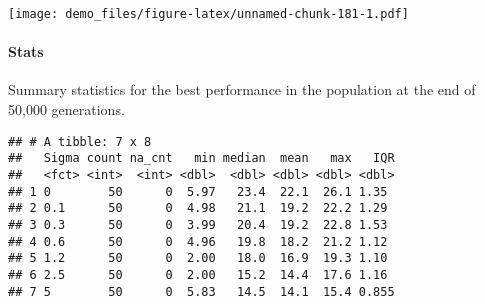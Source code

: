 \documentclass[]{book}
\newenvironment{Shaded}{\begin{snugshade}}{\end{snugshade}}
\newcommand{\DataTypeTok}[1]{\textcolor[rgb]{0.13,0.29,0.53}{#1}}
\newcommand{\KeywordTok}[1]{\textcolor[rgb]{0.13,0.29,0.53}{\textbf{#1}}}
\newcommand{\NormalTok}[1]{#1}
\newcommand{\OperatorTok}[1]{\textcolor[rgb]{0.81,0.36,0.00}{\textbf{#1}}}
\newcommand{\OtherTok}[1]{\textcolor[rgb]{0.56,0.35,0.01}{#1}}
\newcommand{\StringTok}[1]{\textcolor[rgb]{0.31,0.60,0.02}{#1}}
\let\oldparagraph\paragraph
\renewcommand{\paragraph}[1]{\oldparagraph{#1}\mbox{}}
\begin{document}
\texttt{[image: demo\_files/figure-latex/unnamed-chunk-181-1.pdf]}

\hypertarget{stats-35}{%
\paragraph{Stats}\label{stats-35}}

Summary statistics for the best performance in the population at the end of 50,000 generations.

\begin{Shaded}
\end{Shaded}

\begin{verbatim}
## # A tibble: 7 x 8
##   Sigma count na_cnt   min median  mean   max   IQR
##   <fct> <int>  <int> <dbl>  <dbl> <dbl> <dbl> <dbl>
## 1 0        50      0  5.97   23.4  22.1  26.1 1.35 
## 2 0.1      50      0  4.98   21.1  19.2  22.2 1.29 
## 3 0.3      50      0  3.99   20.4  19.2  22.8 1.53 
## 4 0.6      50      0  4.96   19.8  18.2  21.2 1.12 
## 5 1.2      50      0  2.00   18.0  16.9  19.3 1.10 
## 6 2.5      50      0  2.00   15.2  14.4  17.6 1.16 
## 7 5        50      0  5.83   14.5  14.1  15.4 0.855
\end{verbatim}
\end{document}
